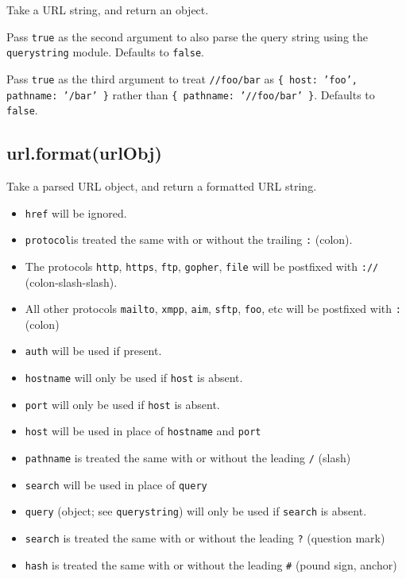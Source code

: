 Take a URL string, and return an object.

Pass \texttt{true} as the second argument to also parse the query string
using the \texttt{querystring} module. Defaults to \texttt{false}.

Pass \texttt{true} as the third argument to treat \texttt{//foo/bar} as
\texttt{\{ host: 'foo', pathname: '/bar' \}} rather than
\texttt{\{ pathname: '//foo/bar' \}}. Defaults to \texttt{false}.

\subsection{url.format(urlObj)}

Take a parsed URL object, and return a formatted URL string.

\begin{itemize}
\item
  \texttt{href} will be ignored.
\item
  \texttt{protocol}is treated the same with or without the trailing
  \texttt{:} (colon).
\item
  The protocols \texttt{http}, \texttt{https}, \texttt{ftp},
  \texttt{gopher}, \texttt{file} will be postfixed with \texttt{://}
  (colon-slash-slash).
\item
  All other protocols \texttt{mailto}, \texttt{xmpp}, \texttt{aim},
  \texttt{sftp}, \texttt{foo}, etc will be postfixed with \texttt{:}
  (colon)
\item
  \texttt{auth} will be used if present.
\item
  \texttt{hostname} will only be used if \texttt{host} is absent.
\item
  \texttt{port} will only be used if \texttt{host} is absent.
\item
  \texttt{host} will be used in place of \texttt{hostname} and
  \texttt{port}
\item
  \texttt{pathname} is treated the same with or without the leading
  \texttt{/} (slash)
\item
  \texttt{search} will be used in place of \texttt{query}
\item
  \texttt{query} (object; see \texttt{querystring}) will only be used if
  \texttt{search} is absent.
\item
  \texttt{search} is treated the same with or without the leading
  \texttt{?} (question mark)
\item
  \texttt{hash} is treated the same with or without the leading
  \texttt{\#} (pound sign, anchor)
\end{itemize}

